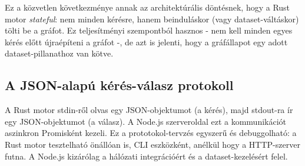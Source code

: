 Ez a közvetlen következménye annak az architektúrális döntésnek, hogy a Rust motor \emph{stateful}: nem minden kérésre, hanem beinduláskor (vagy dataset-váltáskor) tölti be a gráfot. Ez teljesítményi szempontból hasznos - nem kell minden egyes kérés előtt újraépíteni a gráfot -, de azt is jelenti, hogy a gráfállapot egy adott dataset-pillanathoz van kötve.

\subsection{A JSON-alapú kérés-válasz protokoll}

A Rust motor stdin-ről olvas egy JSON-objektumot (a kérés), majd stdout-ra ír egy JSON-objektumot (a válasz). A Node.js szerveroldal ezt a kommunikációt aszinkron Promisként kezeli. Ez a prototokol-tervzés egyszerű és debuggolható: a Rust motor tesztelható önállóan is, CLI eszközként, anélkül hogy a HTTP-szerver futna. A Node.js kizárólag a hálózati integrációért és a dataset-kezelésért felel.
